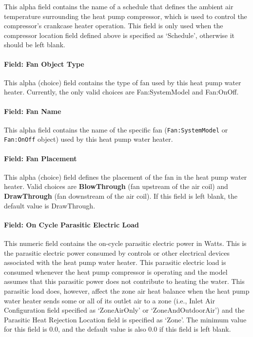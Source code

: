 This alpha field contains the name of a schedule that defines the ambient air temperature surrounding the heat pump compressor, which is used to control the compressor's crankcase heater operation. This field is only used when the compressor location field defined above is specified as `Schedule', otherwise it should be left blank.

\paragraph{Field: Fan Object Type}\label{field-fan-object-type-1}

This alpha (choice) field contains the type of fan used by this heat pump water heater. Currently, the only valid choices are Fan:SystemModel and Fan:OnOff.

\paragraph{Field: Fan Name}\label{field-fan-name-1-000}

This alpha field contains the name of the specific fan (\lstinline!Fan:SystemModel! or \lstinline!Fan:OnOff! object) used by this heat pump water heater.

\paragraph{Field: Fan Placement}\label{field-fan-placement-1-000}

This alpha (choice) field defines the placement of the fan in the heat pump water heater. Valid choices are \textbf{BlowThrough} (fan upstream of the air coil) and \textbf{DrawThrough} (fan downstream of the air coil). If this field is left blank, the default value is DrawThrough.

\paragraph{Field: On Cycle Parasitic Electric Load}\label{field-on-cycle-parasitic-electric-load-1}

This numeric field contains the on-cycle parasitic electric power in Watts. This is the parasitic electric power consumed by controls or other electrical devices associated with the heat pump water heater. This parasitic electric load is consumed whenever the heat pump compressor is operating and the model assumes that this parasitic power does not contribute to heating the water. This parasitic load does, however, affect the zone air heat balance when the heat pump water heater sends some or all of its outlet air to a zone (i.e., Inlet Air Configuration field specified as `ZoneAirOnly' or `ZoneAndOutdoorAir') and the Parasitic Heat Rejection Location field is specified as `Zone'. The minimum value for this field is 0.0, and the default value is also 0.0 if this field is left blank.

